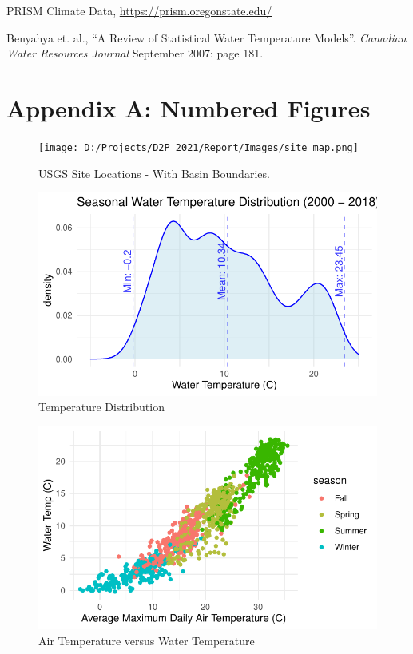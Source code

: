 \documentclass[
]{article}
\begin{document}
PRISM Climate Data, \url{https://prism.oregonstate.edu/}

Benyahya et. al., ``A Review of Statistical Water Temperature Models''.
\emph{Canadian Water Resources Journal} September 2007: page 181.

\hypertarget{appendix-a-numbered-figures}{%
\section{Appendix A: Numbered
Figures}\label{appendix-a-numbered-figures}}

\begin{figure}
\centering
\texttt{[image: D:/Projects/D2P 2021/Report/Images/site\_map.png]}
\caption{USGS Site Locations - With Basin Boundaries.}
\end{figure}

\begin{figure}
\centering
\includegraphics{D2P-Report_files/figure-latex/fig2-1.pdf}
\caption{\label{fig:figs1}Temperature Distribution}
\end{figure}

\begin{figure}
\centering
\includegraphics{D2P-Report_files/figure-latex/fig3-1.pdf}
\caption{\label{fig:figs3}Air Temperature versus Water Temperature}
\end{figure}
\end{document}
